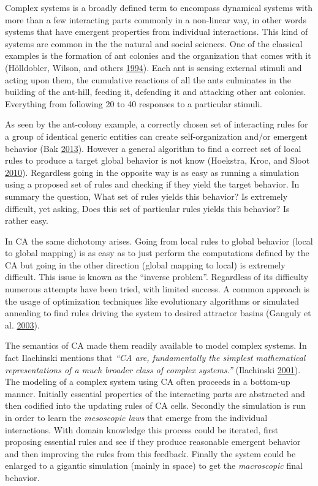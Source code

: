\documentclass[
  openany]{book}
\begin{document}
Complex systems is a broadly defined term to encompass dynamical systems with more than a few interacting parts commonly in a non-linear way, in other words systems that have emergent properties from individual interactions. This kind of systems are common in the the natural and social sciences. One of the classical examples is the formation of ant colonies and the organization that comes with it (Hölldobler, Wilson, and others \protect\hyperlink{ref-holldobler1994journey}{1994}). Each ant is sensing external stimuli and acting upon them, the cumulative reactions of all the ants culminates in the building of the ant-hill, feeding it, defending it and attacking other ant colonies. Everything from following 20 to 40 responses to a particular stimuli.

As seen by the ant-colony example, a correctly chosen set of interacting rules for a group of identical generic entities can create self-organization and/or emergent behavior (Bak \protect\hyperlink{ref-bak2013nature}{2013}). However a general algorithm to find a correct set of local rules to produce a target global behavior is not know (Hoekstra, Kroc, and Sloot \protect\hyperlink{ref-hoekstra2010simulating}{2010}). Regardless going in the opposite way is as easy as running a simulation using a proposed set of rules and checking if they yield the target behavior.
In summary the question, What set of rules yields this behavior? Is extremely difficult, yet asking, Does this set of particular rules yields this behavior? Is rather easy.

In CA the same dichotomy arises. Going from local rules to global behavior (local to global mapping) is as easy as to just perform the computations defined by the CA but going in the other direction (global mapping to local) is extremely difficult. This issue is known as the ``inverse problem''. Regardless of its difficulty numerous attempts have been tried, with limited success. A common approach is the usage of optimization techniques like evolutionary algorithms or simulated annealing to find rules driving the system to desired attractor basins (Ganguly et al. \protect\hyperlink{ref-ganguly2003survey}{2003}).

The semantics of CA made them readily available to model complex systems. In fact Ilachinski mentions that \emph{``CA are, fundamentally the simplest mathematical representations of a much broader class of complex systems.''} (Ilachinski \protect\hyperlink{ref-ilachinski2001cellular}{2001}). The modeling of a complex system using CA often proceeds in a bottom-up manner. Initially essential properties of the interacting parts are abstracted and then codified into the updating rules of CA cells. Secondly the simulation is run in order to learn the \emph{mesoscopic laws} that emerge from the individual interactions. With domain knowledge this process could be iterated, first proposing essential rules and see if they produce reasonable emergent behavior and then improving the rules from this feedback. Finally the system could be enlarged to a gigantic simulation (mainly in space) to get the \emph{macroscopic} final behavior.
\end{document}
